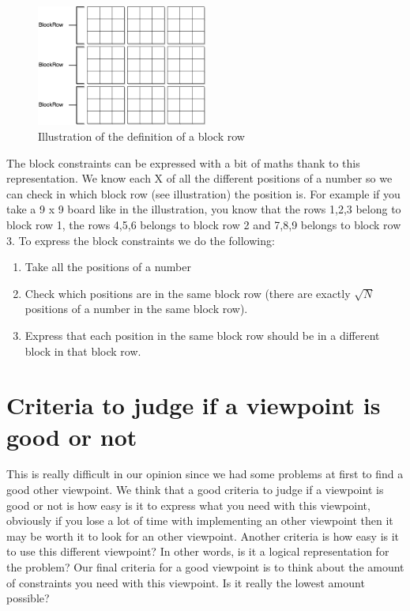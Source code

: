 \documentclass{report}
\begin{document}
\begin{figure}[h]
\centering
\includegraphics[width=0.5\textwidth]{blockRow}
\caption{Illustration of the definition of a block row}
\end{figure}

The block constraints can be expressed with a bit of maths thank to this representation. We know each X of all the different positions of a number so we can check in which block row (see illustration) the position is. For example if you take a 9 x 9 board like in the illustration, you know that the rows 1,2,3 belong to block row 1, the rows 4,5,6 belongs to block row 2 and 7,8,9 belongs to block row 3. To express the block constraints we do the following:
\begin{enumerate}
	\item Take all the positions of a number
	\item Check which positions are in the same block row (there are exactly $\sqrt{N}$ positions of a number in the same block row).
	\item Express that each position in the same block row should be in a different block in that block row.
\end{enumerate}

\section{Criteria to judge if a viewpoint is good or not}
This is really difficult in our opinion since we had some problems at first to find a good other viewpoint. We think that a good criteria to judge if a viewpoint is good or not is how easy is it to express what you need with this viewpoint, obviously if you lose a lot of time with implementing an other viewpoint then it may be worth it to look for an other viewpoint. Another criteria is how easy is it to use this different viewpoint? In other words, is it a logical representation for the problem? Our final criteria for a good viewpoint is to think about the amount of constraints you need with this viewpoint. Is it really the lowest amount possible? 
\end{document}
